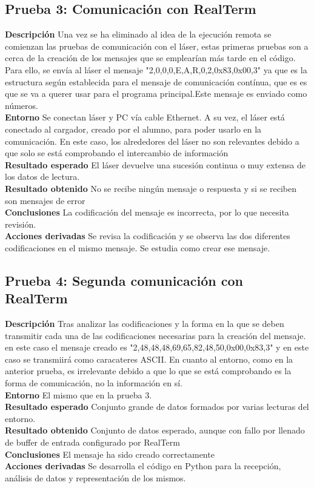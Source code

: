\subsection{Prueba 3: Comunicación con RealTerm}
\textbf{Descripción} Una vez se ha eliminado al idea de la ejecución remota se comienzan las pruebas de comunicación con el láser, estas primeras pruebas son a cerca de la creación de los mensajes que se emplearían más tarde en el código. Para ello, se envía al láser el mensaje "2,0,0,0,E,A,R,0,2,0x83,0x00,3" ya que es la estructura según establecida para el mensaje de comunicación contínua, que es es que se va a querer usar para el programa principal.Este mensaje es enviado como números.\\
\textbf{Entorno} Se conectan láser y PC vía cable Ethernet. A su vez, el láser está conectado al cargador, creado por el alumno, para poder usarlo en la comunicación. En este caso, los alrededores del láser no son relevantes debido a que solo se está comprobando el intercambio de información\\
\textbf{Resultado esperado} El láser devuelve una sucesión continua o muy extensa de los datos de lectura.\\
\textbf{Resultado obtenido} No se recibe ningún mensaje o respuesta y si se reciben son mensajes de error\\
\textbf{Conclusiones} La codificación del mensaje es incorrecta, por lo que necesita revisión.\\
\textbf{Acciones derivadas}  Se revisa la codificación y se observa las dos diferentes codificaciones en el mismo mensaje. Se estudia como crear ese mensaje.\\

\subsection{Prueba 4: Segunda comunicación con RealTerm}
\textbf{Descripción} Tras analizar las codificaciones y la forma en la que se deben transmitir cada una de las codificaciones necesarias para la creación del mensaje. en este caso el mensaje creado es "2,48,48,48,69,65,82,48,50,0x00,0x83,3" y en este caso se transmiirá como caracateres ASCII. En cuanto al entorno, como en la anterior prueba, es irrelevante debido a que lo que se está comprobando es la forma de comunicación, no la información en sí.\\
\textbf{Entorno} El mismo que en la prueba 3.\\
\textbf{Resultado esperado} Conjunto grande de datos formados por varias lecturas del entorno.\\
\textbf{Resultado obtenido} Conjunto de datos esperado, aunque con fallo por llenado de buffer de entrada configurado por RealTerm\\
\textbf{Conclusiones} El mensaje ha sido creado correctamente\\
\textbf{Acciones derivadas}  Se desarrolla el código en Python para la recepción, análisis de datos y representación de los mismos.

